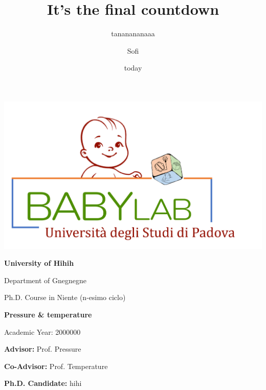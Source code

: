 \documentclass[
]{article}
\title{It's the final countdown}
\subtitle{tananananaaa}
\author{Sofi}
\date{today}
\begin{document}
\maketitle


	\begin{center}
		\includegraphics[width=0.25\linewidth]{images/LOGO.png}
	\end{center}
	
	\begin{center}
		\begin{Large}
			\textbf{University of Hihih}
			
			Department of Gnegnegne
		\end{Large}
		
	\end{center}
	
	\vspace{3mm}
	\begin{center}
		\begin{large}
			Ph.D. Course in Niente (n-esimo ciclo)
		\end{large}
		
		\begin{huge}
			\bfseries
			Pressure \& temperature
		\end{huge}
		
		
	\end{center}
	
	
	\begin{center}
		Academic Year: 2000000
	\end{center}
	


\vspace{2cm}
	\begin{multicols}{2}
		\begin{flushleft}
				\textbf{Advisor:} Prof. Pressure
				
				\textbf{Co-Advisor:} Prof. Temperature
			
		\end{flushleft}
		\columnbreak
		\begin{flushright}
			\vspace{1.5cm}
			
				\textbf{Ph.D. Candidate:} hihi
			
		\end{flushright}
		
	\end{multicols}
\end{document}
